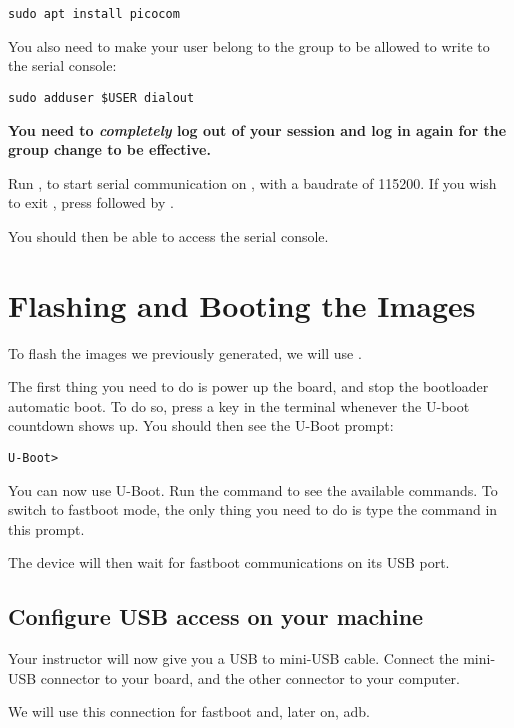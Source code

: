 \begin{verbatim}
sudo apt install picocom
\end{verbatim}

You also need to make your user belong to the  group to be
allowed to write to the serial console:

\begin{verbatim}
sudo adduser $USER dialout
\end{verbatim}

{\bf You need to {\em completely} log out of your session and log in again
for the group change to be effective.}

Run , to start serial
communication on , with a baudrate of 115200. If
you wish to exit , press \code{[Ctrl][a]} followed by
\code{[Ctrl][x]}.

You should then be able to access the serial console.

\section{Flashing and Booting the Images}

To flash the images we previously generated, we will use
.

The first thing you need to do is power up the board, and stop the
bootloader automatic boot. To do so, press a key in the 
terminal whenever the U-boot countdown shows up. You should then see
the U-Boot prompt:
\begin{verbatim}
U-Boot>
\end{verbatim}

You can now use U-Boot. Run the  command to see the
available commands. To switch to fastboot mode, the only thing you
need to do is type the command  in this prompt.

The device will then wait for fastboot communications on its USB port.

\subsection{Configure USB access on your machine}

Your instructor will now give you a USB to mini-USB cable. Connect
the mini-USB connector to your board, and the other connector to your
computer.

We will use this connection for fastboot and, later on, adb.

